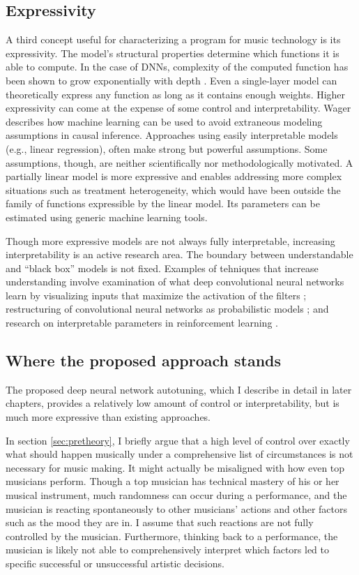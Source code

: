 \subsection{Expressivity}
A third concept useful for characterizing a program for music technology is its expressivity. The model's structural properties determine which functions it is able to compute. In the case of DNNs, complexity of the computed function has been shown to grow exponentially with depth \cite{raghu2017expressive}. Even a single-layer model can theoretically express any function as long as it contains enough weights. Higher expressivity can come at the expense of some control and interpretability. Wager describes how machine learning can be used to avoid extraneous modeling assumptions in causal inference. Approaches using easily interpretable models (e.g., linear regression), often make strong but powerful assumptions. Some assumptions, though, are neither scientifically nor methodologically motivated. A partially linear model is more expressive and enables addressing more complex situations such as treatment heterogeneity, which would have been outside the family of functions expressible by the linear model. Its parameters can be estimated using generic machine learning tools. \cite{wager2019causal} 

Though more expressive models are not always fully interpretable, increasing interpretability is an active research area. The boundary between understandable and ``black box'' models is not fixed. Examples of tehniques that increase understanding involve examination of what deep convolutional neural networks learn by visualizing inputs that maximize the activation of the filters \cite{qin2018convolutional}; restructuring of convolutional neural networks as probabilistic models \cite{patel2016probabilistic}; and research on interpretable parameters in reinforcement learning \cite{verma2018programmatically}. 

\subsection{Where the proposed approach stands}
The proposed deep neural network autotuning, which I describe in detail in later chapters, provides a relatively low amount of control or interpretability, but is much more expressive than existing approaches. 

In section \ref{sec:pretheory}, I briefly argue that a high level of control over exactly what should happen musically under a comprehensive list of circumstances is not necessary for music making. It might actually be misaligned with how even top musicians perform. Though a top musician has technical mastery of his or her musical instrument, much randomness can occur during a performance, and the musician is reacting spontaneously to other musicians' actions and other factors such as the mood they are in. I assume that such reactions are not fully controlled by the musician. Furthermore, thinking back to a performance, the musician is likely not able to comprehensively interpret which factors led to specific successful or unsuccessful artistic decisions. 


